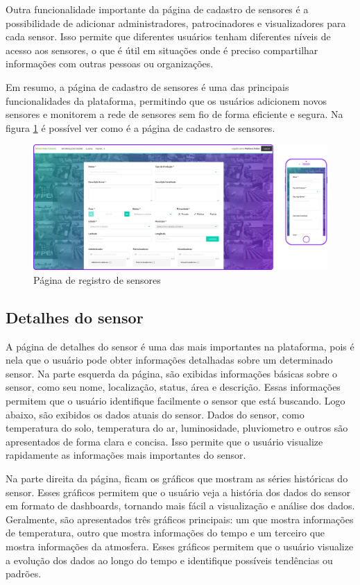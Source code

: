 \documentclass[tcc,capa]{texufpel}
\begin{document}
Outra funcionalidade importante da página de cadastro de sensores é a possibilidade de adicionar administradores, patrocinadores e visualizadores para cada sensor. Isso permite que diferentes usuários tenham diferentes níveis de acesso aos sensores, o que é útil em situações onde é preciso compartilhar informações com outras pessoas ou organizações.

Em resumo, a página de cadastro de sensores é uma das principais funcionalidades da plataforma, permitindo que os usuários adicionem novos sensores e monitorem a rede de sensores sem fio de forma eficiente e segura. Na figura \ref{registro} é possível ver como é a página de cadastro de sensores.
\begin{figure}[htbp]
  \centering \includegraphics[scale=.2]{assets/cadastrosensores.png}
  \caption{Página de registro de sensores}
  \label{registro}
\end{figure}
\newpage

\subsection{Detalhes do sensor}
A página de detalhes do sensor é uma das mais importantes na plataforma, pois é nela que o usuário pode obter informações detalhadas sobre um determinado sensor. Na parte esquerda da página, são exibidas informações básicas sobre o sensor, como seu nome, localização, status, área e descrição. Essas informações permitem que o usuário identifique facilmente o sensor que está buscando.
Logo abaixo, são exibidos os dados atuais do sensor. Dados do sensor, como temperatura do solo, temperatura do ar, luminosidade, pluviometro e outros são apresentados de forma clara e concisa. Isso permite que o usuário visualize rapidamente as informações mais importantes do sensor.

Na parte direita da página, ficam os gráficos que mostram as séries históricas do sensor. Esses gráficos permitem que o usuário veja a história dos dados do sensor em formato de dashboards, tornando mais fácil a visualização e análise dos dados. Geralmente, são apresentados três gráficos principais: um que mostra informações de temperatura, outro que mostra informações do tempo e um terceiro que mostra informações da atmosfera. Esses gráficos permitem que o usuário visualize a evolução dos dados ao longo do tempo e identifique possíveis tendências ou padrões.
\end{document}
